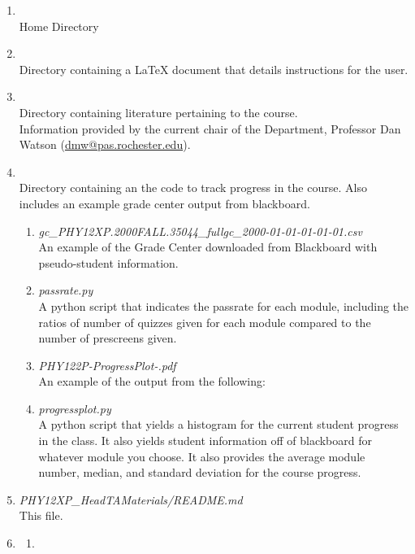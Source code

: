 \documentclass[12pt]{article}
\begin{document}
\begin{mdframed}[style=MyFrame]
\begin{enumerate}
	\item {} \\
		Home Directory
	\item {} \\
		Directory containing a LaTeX document that details instructions for the user.
	\item {} \\
		Directory containing literature pertaining to the course. \\
		Information provided by the current chair of the Department, Professor Dan Watson (\url{dmw@pas.rochester.edu}).
	\item {} \\
		Directory containing an the code to track progress in the course. Also includes an example grade center output from blackboard.
	\begin{enumerate}
		\item \emph{gc\_PHY12XP.2000FALL.35044\_fullgc\_2000-01-01-01-01-01.csv} \\
			An example of the Grade Center downloaded from Blackboard with pseudo-student information.
		\item \emph{passrate.py} \\
			A python script that indicates the passrate for each module, including the ratios of number of quizzes given for each module compared to the number of prescreens given.
		\item \emph{PHY122P-ProgressPlot-.pdf} \\
			An example of the output from the following:
		\item \emph{progressplot.py} \\
			A python script that yields a histogram for the current student progress in the class. It also yields student information off of blackboard for whatever module you choose. It also provides the average module number, median, and standard deviation for the course progress.
	\end{enumerate}
	\item \emph{PHY12XP\_HeadTAMaterials/README.md} \\
		This file.
	\item {}
	\begin{enumerate}
		\item {} \\

\end{enumerate}
\end{enumerate}
\end{mdframed}
\end{document}
